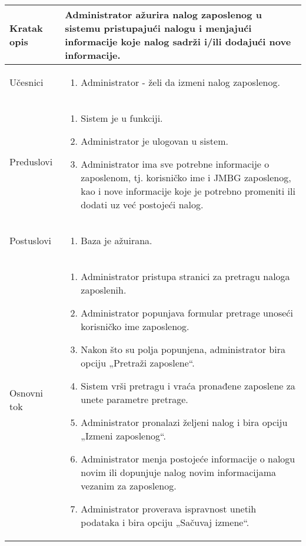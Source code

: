 \documentclass[../main.tex]{subfiles}
\begin{document}
\begin{longtable}{| p{} | p{} |} 

\hline
    Kratak opis &  Administrator ažurira nalog zaposlenog u sistemu pristupajući nalogu i menjajući informacije koje nalog sadrži i/ili dodajući nove informacije.\\ 
\hline    
    Učesnici & 
    	\begin{enumerate}
        \item Administrator - želi da izmeni nalog zaposlenog.
     \end{enumerate}\\
\hline
   Preduslovi & \begin{enumerate}
       \item Sistem je u funkciji.
       \item Administrator je ulogovan u sistem.
       \item Administrator ima sve potrebne informacije o zaposlenom, tj. korisničko ime i JMBG zaposlenog, kao i nove informacije koje je potrebno promeniti ili dodati uz već postojeći nalog.
   \end{enumerate}\\
\hline  
    Postuslovi & \begin{enumerate}
        \item Baza je ažuirana.
    \end{enumerate}\\
\hline
    Osnovni tok & \begin{enumerate}
        \item Administrator pristupa stranici za pretragu naloga zaposlenih.
        \item Administrator popunjava formular pretrage unoseći korisničko ime zaposlenog.
        \item Nakon što su polja popunjena, administrator bira opciju „Pretraži zaposlene“.
        \item Sistem vrši pretragu i vraća pronađene zaposlene za unete parametre pretrage.
        \item Administrator pronalazi željeni nalog i bira opciju „Izmeni zaposlenog“.
        \item Administrator menja postojeće informacije o nalogu novim ili dopunjuje nalog novim informacijama vezanim za zaposlenog.
        \item Administrator proverava ispravnost unetih podataka i bira opciju „Sačuvaj izmene“.

\end{enumerate}
\end{longtable}
\end{document}
